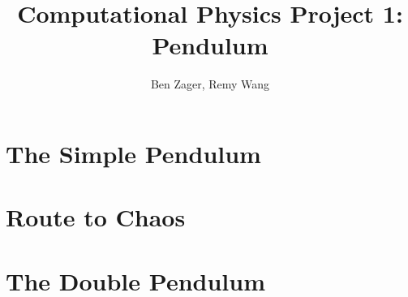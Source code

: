 \documentclass[12pt]{article}
\begin{document}
  
\title{Computational Physics Project 1: Pendulum}
\author{Ben Zager, Remy Wang}
\maketitle
 
\section*{The Simple Pendulum}


\section*{Route to Chaos}


\section*{The Double Pendulum}

\end{document}
